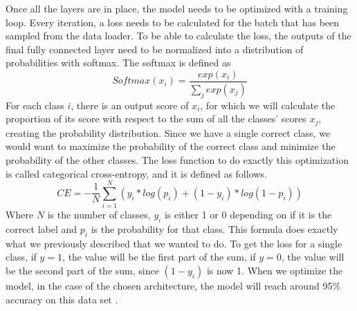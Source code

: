 Once all the layers are in place, the model needs to be optimized with a training loop.
Every iteration, a loss needs to be calculated for the batch that has been sampled from the data loader.
To be able to calculate the loss, the outputs of the final fully connected layer need to be normalized into a distribution of probabilities with softmax.
The softmax is defined as
\[{Softmax(x_i) = \frac{exp(x_i)}{\sum_j exp(x_j)}}\] \noindent
For each class $i$, there is an output score of $x_i$, for which we will calculate the proportion of its score with respect to the sum of all the classes' scores $x_j$, creating the probability distribution.
Since we have a single correct class, we would want to maximize the probability of the correct class and minimize the probability of the other classes.
The loss function to do exactly this optimization is called categorical cross-entropy, and it is defined as follows.
\[{CE = -\frac{1}{N}\sum_{i=1}^{N}(y_i * log(p_i) + ( 1 - y_i ) * log ( 1 - p_i))}\] \noindent
Where $N$ is the number of classes, $y_i$ is either 1 or 0 depending on if it is the correct label and $p_i$ is the probability for that class.
This formula does exactly what we previously described that we wanted to do.
To get the loss for a single class, if $y = 1$, the value will be the first part of the sum, if $y = 0$, the value will be the second part of the sum, since $(1 - y_i)$ is now 1.
When we optimize the model, in the case of the chosen architecture, the model will reach around 95\% accuracy on this data set \citep{efficientNet}.